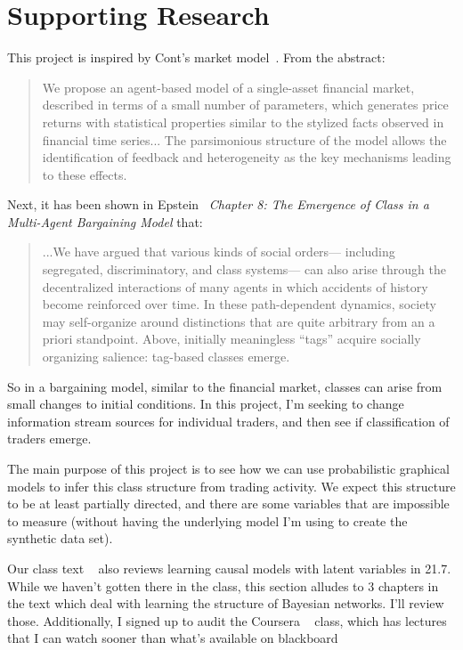 \documentclass[a4paper, 11pt]{report}
\begin{document}
\section{Supporting Research}
This project is inspired by Cont's market model~\cite{ghoulmie_cont_nadal_2005}. From the abstract:
\begin{quote} 
	We propose an agent-based model of a single-asset financial market, described in terms of a small number of parameters, which generates price returns with statistical properties similar to the stylized facts observed in financial time series... The parsimonious structure of the model allows the identification of feedback and heterogeneity as the key mechanisms leading to these effects. 
\end{quote}
Next, it has been shown in Epstein~\cite{epstein2007generative} \textit{Chapter 8: The Emergence of Class in a Multi-Agent Bargaining Model} that:
\begin{quote}
	...We have argued that various kinds of social orders— including segregated, discriminatory, and class systems— can also arise through the decentralized interactions of many agents in which accidents of history become reinforced over time. In these path-dependent dynamics, society may self-organize around distinctions that are quite arbitrary from an a priori standpoint. Above, initially meaningless “tags” acquire socially organizing salience: tag-based classes emerge.
\end{quote}
	So in a bargaining model, similar to the financial market, classes can arise from small changes to initial conditions. In this project, I'm seeking to change information stream sources for individual traders, and then see if classification of traders emerge. 
	
	The main purpose of this project is to see how we can use probabilistic graphical models to infer this class structure from trading activity. We expect this structure to be at least partially directed, and there are some variables that are impossible to measure (without having the underlying model I'm using to create the synthetic data set). 
	
	Our class text ~\cite{koller2009} also reviews learning causal models with latent variables in 21.7. While we haven't gotten there in the class, this section alludes to 3 chapters in the text which deal with learning the structure of Bayesian networks. I'll review those. Additionally, I signed up to audit the Coursera ~\cite{coursera} class, which has lectures that I can watch sooner than what's available on blackboard
	
\end{document}
